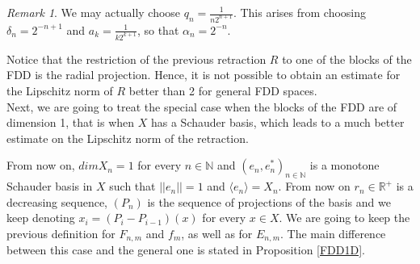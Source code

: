 \documentclass[11pt]{amsart}
\newcommand{\N}{\mathbb{N}}
\newcommand{\R}{\mathbb{R}}
\newcommand{\<}{\langle}
\renewcommand{\>}{\rangle}
\theoremstyle{definition}
\theoremstyle{remark}
\newtheorem{remark}[theorem]{Remark}
\numberwithin{equation}{section}
\def\R{{\mathbb R}}
\begin{document}
\begin{remark}\label{quotient}
We may actually choose $q_n=\frac{1}{n2^{n+1}}$. This arises from choosing $\delta_n=2^{-n+1}$ and $a_k=\frac{1}{k2^{k+1}}$, so that $\alpha_n=2^{-n}$.
\end{remark}

Notice that the restriction of the previous retraction $R$ to one of the blocks of the FDD is the radial projection. Hence, it is not possible to obtain an estimate for the Lipschitz norm of $R$ better than 2 for general FDD spaces.\\
Next, we are going to treat the special case when the blocks of the FDD are of dimension 1, that is when $X$ has a Schauder basis, which leads to a much
 better estimate on the Lipschitz norm of the retraction.

From now on, $dim X_n=1$ for every $n\in\N$ and $(e_n,e_n^*)_{n\in\N}$ is a monotone Schauder basis in $X$ such that $||e_n||=1$  and $\langle e_n \rangle=X_n$. From now on $r_n\in\R^+$ is a decreasing sequence, $(P_n)$ is the sequence of projections of the basis and we keep denoting $x_i=(P_i-P_{i-1})(x)$ for every $x\in X$. We are going to keep the previous definition for $F_{n,m}$ and $f_m$, as well as for $E_{n,m}$. The main difference between this case and the general one is stated in Proposition \ref{FDD1D}.
\end{document}
